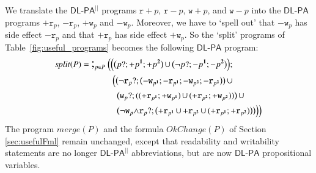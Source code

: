 \documentclass{llncs}
\newcommand{\cp}[2]{{#2}^\mathbf{#1}}
\newcommand{\pll}{ {||} }							%
\newcommand{\readable}[1]{\mathtt{r}_{#1}}
\newcommand{\writable}[1]{\mathtt{w}_{#1}}
\newcommand{\testpdl}{?}				%
\newcommand{\Dlpa}{\ensuremath{\mathsf{DL\text{-}PA}}\xspace}
\newcommand{\DlpaPll}{\ensuremath{\mathsf{DL\text{-}PA}^\pll}\xspace}
\newcommand{\assgntop}[1]{{\mathtt {+} #1}}
\newcommand{\assgnbot}[1]{{\mathtt {-} #1}}
\newcommand{\assgntopR}[1]{{\mathtt r {+} #1}}
\newcommand{\assgnbotR}[1]{{\mathtt r {-} #1}}
\newcommand{\assgntopW}[1]{{\mathtt w {+} #1}}
\newcommand{\assgnbotW}[1]{{\mathtt w {-} #1}}
\newcommand{\assgntopV}[1]{{\mathtt {+} #1}}
\newcommand{\assgnbotV}[1]{{\mathtt {-} #1}}
\newcommand{\leqv}{ \leftrightarrow }
\newcommand{\limp}{ \rightarrow }
\newcommand{\ndet}{\,{\cup}\,}
\newcommand{\seqseq}[1]{ \text{\Large ;}_{#1} ~ }
\begin{document}
We translate the \DlpaPll programs
$\assgntopR{p}$, 
$\assgnbotR{p}$, 
$\assgntopW{p}$, and 
$\assgnbotW{p}$ 
into the \Dlpa programs 
$\assgntop{ \readable{p}}$,
$\assgnbot{ \readable{p}}$,
$\assgntop{ \writable{p}}$ and
$\assgnbot{ \writable{p}}$.
Moreover, we have to `spell out' that 
$\assgnbot{ \writable p }$ has side effect $\assgnbot{ \readable p }$ and that  
$\assgntop{ \readable p }$ has side effect $\assgntop{ \writable p }$. 
So the `split' programs of Table~\ref{fig:useful_programs} becomes the following \Dlpa program:
\begin{align*}
\mathit{split}(P) =&\ \seqseq{p \in P} \Big( 
\Big(
  \big( p \testpdl ; \assgntopV{ \cp{1}{p} } ; \assgntopV{ \cp{2}{p} } \big) \ndet 
  \big( \lnot p \testpdl ; \assgnbotV{ \cp{1}{p} } ; \assgnbotV{ \cp{2}{p} } \big) 
\Big) ;
\\& ~~~~~~~~~~~
\Big(
  \big(\lnot \readable p  \testpdl ; \big( \assgnbot{ \writable{\cp 1 {p}}} ; \assgnbot{ \readable{\cp 1 {p}}} ; \assgnbot{ \writable{\cp 2 {p}}} ; \assgnbot{ \readable{\cp 2 {p}}} \big) \big) \ndet 
  \\& ~~~~~~~~~~~~~
  \big(\writable{p} \testpdl ; ( (\assgntop{ \readable{\cp 1 {p}}} ; \assgntop{ \writable{\cp 1 {p}}}) \ndet (\assgntop{ \readable{\cp 2 {p}}} ; \assgntop{ \writable{\cp 2 {p}}}) ) \big) 			 \ndet
  \\& ~~~~~~~~~~~~~
  \big(\lnot \writable{p} {\land} \readable p  \testpdl ; \big( \assgntop{ \readable{\cp 1 {p}}} \ndet \assgntop{ \readable{\cp 2 {p}}} \ndet 
(\assgntop{ \readable{\cp 1 {p}}}  ; \assgntop{ \readable{\cp 2 {p}}}) \big) \big) 
\Big)
\Big)
\end{align*}
The program $\mathit{merge}(P)$ and the formula $\mathit{OkChange}(P)$
of Section \ref{sec:usefulFml} remain unchanged, except that 
readability and writability statements are no longer \DlpaPll abbreviations, but are now \Dlpa propositional variables. 
\end{document}
